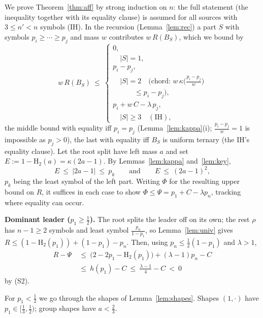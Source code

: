 \documentclass[journal]{IEEEtran}
\theoremstyle{definition}
\newcommand{\Hh}{\mathrm H_2}
\newcommand{\kp}{\kappa}
\newcommand{\CC}{C}
\newcommand{\lam}{\lambda}
\begin{document}
We prove Theorem~\ref{thm:aff} by strong induction on $n$: the full
statement (the inequality together with its equality clause) is
assumed for all sources with $3\le n'<n$ symbols (IH). In the recursion
(Lemma~\ref{lem:rec}) a part $S$ with symbols $p_i\ge\cdots\ge p_j$ and mass $w$
contributes $w\,R(B_S)$, which we bound by
\begin{equation}\label{eq:children}
  w\,R(B_S)\ \le\
  \begin{cases}
    0,\\
    \quad |S|=1,\\[2pt]
    p_i-p_j,\\
    \quad |S|=2\quad(\text{chord: }w\,\kp\bigl(\tfrac{p_i-p_j}{w}\bigr)\\
    \qquad\quad\le p_i-p_j),\\[2pt]
    p_i+w\,\CC-\lam\,p_j,\\
    \quad |S|\ge3\quad(\text{IH}),
  \end{cases}
\end{equation}
the middle bound with equality iff $p_i=p_j$ (Lemma~\ref{lem:kappa}(i);
$\tfrac{p_i-p_j}{w}=1$ is impossible as $p_j>0$), the last with equality iff
$B_S$ is uniform ternary (the IH's equality clause). Let the root split have
left mass $a$ and set $E:=1-\Hh(a)=\kp(2a-1)$. By
Lemmas~\ref{lem:kappa} and~\ref{lem:key},
\begin{equation}\label{eq:E}
  E\ \le\ |2a-1|\ \le\ p_k
  \qquad\text{and}\qquad
  E\ \le\ (2a-1)^2 ,
\end{equation}
$p_k$ being the least symbol of the left part. Writing $\Phi$ for the resulting
upper bound on $R$, it suffices in each case to show $\Phi\le\Psi
=p_1+\CC-\lam p_n$, tracking where equality can occur.

\medskip\noindent\textbf{Dominant leader ($p_1\ge\tfrac12$).}
The root splits the leader off on its own; the rest $\rho$ has $n-1\ge2$ symbols and least symbol
$\tfrac{p_n}{1-p_1}$, so Lemma~\ref{lem:univ} gives
$R\le(1-\Hh(p_1))+(1-p_1)-p_n$. Then, using $p_n\le\tfrac12(1-p_1)$ and
$\lam>1$,
\[
\begin{aligned}
  R-\Psi\ &\le\ \bigl(2-2p_1-\Hh(p_1)\bigr)+(\lam-1)p_n-\CC\\
  &\le\ h(p_1)-\CC\ \le\ \tfrac{\lam-1}{4}-\CC\ <\ 0
\end{aligned}
\]
by (S2).

\smallskip
For $p_1<\tfrac12$ we go through the shapes of Lemma~\ref{lem:shapes}. Shapes
$(1,\cdot)$ have $p_1\in[\tfrac13,\tfrac12)$; group shapes have $a<\tfrac23$.
\end{document}
